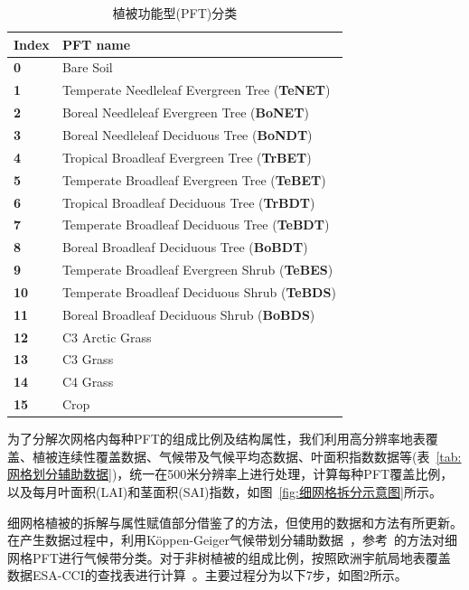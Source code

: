 \begin{table}[htbp]
\centering
\caption{植被功能型(PFT)分类}
\label{tab:PFT分类及缩写}
\begin{tabular}{l l}
\toprule
\textbf{Index} & \textbf{PFT name} \\

\midrule
\textbf{0} & Bare Soil \\
\hline
\textbf{1} & Temperate Needleleaf Evergreen Tree (\textbf{TeNET}) \\
\hline
\textbf{2} & Boreal Needleleaf Evergreen Tree (\textbf{BoNET}) \\
\hline
\textbf{3} & Boreal Needleleaf Deciduous Tree (\textbf{BoNDT}) \\
\hline
\textbf{4} & Tropical Broadleaf Evergreen Tree (\textbf{TrBET}) \\
\hline
\textbf{5} & Temperate Broadleaf Evergreen Tree (\textbf{TeBET}) \\
\hline
\textbf{6} & Tropical Broadleaf Deciduous Tree (\textbf{TrBDT}) \\
\hline
\textbf{7} & Temperate Broadleaf Deciduous Tree (\textbf{TeBDT}) \\
\hline
\textbf{8} & Boreal Broadleaf Deciduous Tree (\textbf{BoBDT}) \\
\hline
\textbf{9} & Temperate Broadleaf Evergreen Shrub (\textbf{TeBES}) \\
\hline
\textbf{10} & Temperate Broadleaf Deciduous Shrub (\textbf{TeBDS}) \\
\hline
\textbf{11} & Boreal Broadleaf Deciduous Shrub (\textbf{BoBDS}) \\
\hline
\textbf{12} & C3 Arctic Grass \\
\hline
\textbf{13} & C3 Grass \\
\hline
\textbf{14} & C4 Grass  \\
\hline
\textbf{15} & Crop \\
\bottomrule
\end{tabular}

\end{table}

为了分解次网格内每种PFT的组成比例及结构属性，我们利用高分辨率地表覆盖、植被连续性覆盖数据、气候带及气候平均态数据、叶面积指数数据等(表~\ref{tab:网格划分辅助数据})，统一在500米分辨率上进行处理，计算每种PFT覆盖比例，以及每月叶面积(LAI)和茎面积(SAI)指数，如图~\ref{fig:细网格拆分示意图}所示。

细网格植被的拆解与属性赋值部分借鉴了\citet{lawrence2007representing}的方法，但使用的数据和方法有所更新。在产生数据过程中，利用Köppen-Geiger气候带划分辅助数据~\citep{beck2018}，参考~\citet{poulter2011PlantFunctionalType}的方法对细网格PFT进行气候带分类。对于非树植被的组成比例，按照欧洲宇航局地表覆盖数据ESA-CCI的查找表进行计算~\citep{poulter2015PlantFunctionalType}。主要过程分为以下7步，如图2所示。

